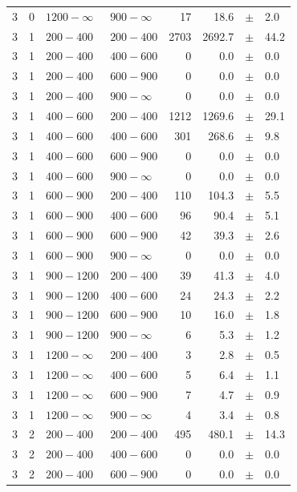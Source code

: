 \begin{table}[!t]
\begin{tabular}{rrllrrcl}
3 & 0 & $1200- \infty$ & $900-\infty$ &     17 &     18.6 &$\pm$&    2.0 \\
3 & 1 & $ 200- 400$ & $200-400$ &   2703 &   2692.7 &$\pm$&   44.2 \\
3 & 1 & $ 200- 400$ & $400-600$ &      0 &      0.0 &$\pm$&    0.0 \\
3 & 1 & $ 200- 400$ & $600-900$ &      0 &      0.0 &$\pm$&    0.0 \\
3 & 1 & $ 200- 400$ & $900-\infty$ &      0 &      0.0 &$\pm$&    0.0 \\
3 & 1 & $ 400- 600$ & $200-400$ &   1212 &   1269.6 &$\pm$&   29.1 \\
3 & 1 & $ 400- 600$ & $400-600$ &    301 &    268.6 &$\pm$&    9.8 \\
3 & 1 & $ 400- 600$ & $600-900$ &      0 &      0.0 &$\pm$&    0.0 \\
3 & 1 & $ 400- 600$ & $900-\infty$ &      0 &      0.0 &$\pm$&    0.0 \\
3 & 1 & $ 600- 900$ & $200-400$ &    110 &    104.3 &$\pm$&    5.5 \\
3 & 1 & $ 600- 900$ & $400-600$ &     96 &     90.4 &$\pm$&    5.1 \\
3 & 1 & $ 600- 900$ & $600-900$ &     42 &     39.3 &$\pm$&    2.6 \\
3 & 1 & $ 600- 900$ & $900-\infty$ &      0 &      0.0 &$\pm$&    0.0 \\
3 & 1 & $ 900-1200$ & $200-400$ &     39 &     41.3 &$\pm$&    4.0 \\
3 & 1 & $ 900-1200$ & $400-600$ &     24 &     24.3 &$\pm$&    2.2 \\
3 & 1 & $ 900-1200$ & $600-900$ &     10 &     16.0 &$\pm$&    1.8 \\
3 & 1 & $ 900-1200$ & $900-\infty$ &      6 &      5.3 &$\pm$&    1.2 \\
3 & 1 & $1200- \infty$ & $200-400$ &      3 &      2.8 &$\pm$&    0.5 \\
3 & 1 & $1200- \infty$ & $400-600$ &      5 &      6.4 &$\pm$&    1.1 \\
3 & 1 & $1200- \infty$ & $600-900$ &      7 &      4.7 &$\pm$&    0.9 \\
3 & 1 & $1200- \infty$ & $900-\infty$ &      4 &      3.4 &$\pm$&    0.8 \\
3 & 2 & $ 200- 400$ & $200-400$ &    495 &    480.1 &$\pm$&   14.3 \\
3 & 2 & $ 200- 400$ & $400-600$ &      0 &      0.0 &$\pm$&    0.0 \\
3 & 2 & $ 200- 400$ & $600-900$ &      0 &      0.0 &$\pm$&    0.0 \\

\end{tabular}
\end{table}
